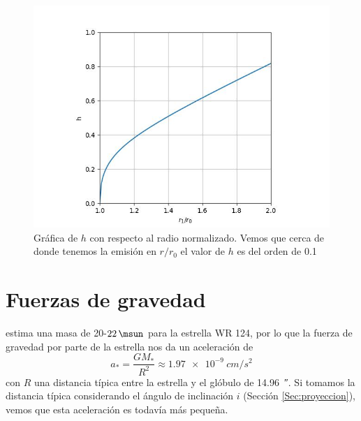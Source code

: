 \documentclass{book}
\begin{document}
\begin{figure}
    \centering
    \includegraphics{Appendices/h_3.jpg}
    \caption{Gráfica de $h$ con respecto al radio normalizado. Vemos que cerca de donde tenemos la emisión en $r/r_0$ el valor de $h$ es del orden de 0.1}
    \label{fig:h}
\end{figure}

\section{Fuerzas de gravedad} \label{F gravedad}

\cite{Hamann:2019} estima una masa  de 20-$\SI{22}{\msun}$ para la estrella WR 124, por lo que la fuerza de gravedad por parte de la estrella nos da un aceleración de 
\begin{equation}
a_*=\frac{GM_*}{R^2}\approx \SI{1.97e-9}{cm/s^2}
\end{equation}
con $R$ una distancia típica entre la estrella y el glóbulo de \SI{14.96}{\arcsecond}. Si tomamos la distancia típica considerando el ángulo de inclinación $i$ (Sección \ref{Sec:proyeccion}), vemos que esta aceleración es todavía más pequeña.
\end{document}
